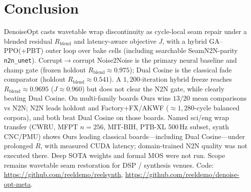 \section{Conclusion}
\label{sec:conclusion}

DenoiseOpt casts wavetable wrap discontinuity as cycle-local seam repair under a blended residual
$R_{\mathrm{blend}}$ and latency-aware objective $J$, with a hybrid GA--PPO(+PBT) outer loop over bake cells
(including searchable SeamN2N-parity \texttt{n2n\_unet}).
Corrupt$\to$corrupt Noise2Noise is the primary neural baseline and champ gate
(frozen holdout $R_{\mathrm{blend}}{\approx}0.975$); Dual Cosine is the classical fade comparator
(holdout $R_{\mathrm{blend}}{\approx}0.541$).
A $1{,}200$-iteration hybrid freeze reaches $R_{\mathrm{blend}}{\approx}0.9695$ ($J{\approx}0.960$) but does not clear the N2N gate,
while clearly beating Dual Cosine.
On multi-family boards Ours wins $13/20$ mean comparisons vs N2N; N2N leads holdout and Factory+FX/AKWF
(${\approx}1{,}280$-cycle balanced corpora), and both beat Dual Cosine on those boards.
Named sci/eng wrap transfer (CWRU, MFPT $n{=}256$, MIT-BIH, PTB-XL 500\,Hz subset, synth CNC/PMU)
shows Ours leading classical boards---including Dual Cosine---under prolonged $R$, with measured CUDA latency;
domain-trained N2N quality was not executed there.
Deep SOTA weights and formal MOS were not run.
Scope remains wavetable seam restoration for DSP / synthesis venues.
Code: \url{https://github.com/reeldemo/reelsynth}, \url{https://github.com/reeldemo/denoise-opt-meta}.

